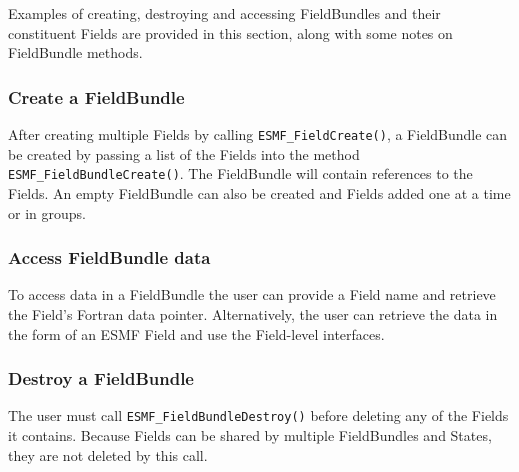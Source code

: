 

Examples of creating, destroying and accessing FieldBundles and their
constituent Fields are provided in this section, along with some
notes on FieldBundle methods.

\subsubsection{Create a FieldBundle}

After creating multiple Fields by calling {\tt ESMF\_FieldCreate()}, a FieldBundle
can be created by passing a list of the Fields into the method 
{\tt ESMF\_FieldBundleCreate()}.  The FieldBundle will contain
references to the Fields.  An empty FieldBundle can also be created
and Fields added one at a time or in groups.

\subsubsection{Access FieldBundle data}

To access data in a FieldBundle the user can provide a Field
name and retrieve the Field's Fortran data pointer.  Alternatively,
the user can retrieve the data in the form of an ESMF 
Field and use the Field-level interfaces.

\subsubsection{Destroy a FieldBundle}

The user must call {\tt ESMF\_FieldBundleDestroy()} before 
deleting any of the Fields it contains.  Because Fields
can be shared by multiple FieldBundles and States, they are
not deleted by this call.


